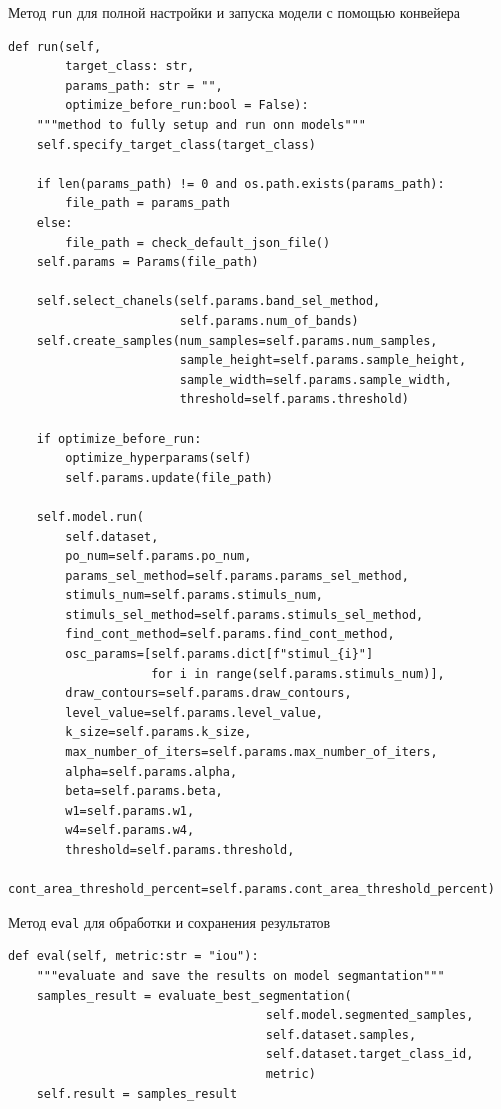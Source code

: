 \documentclass[14pt, russian]{scrartcl}
\begin{document}
\begin{listing}[htt!]
    \caption{Метод \texttt{run} для полной настройки и запуска модели с помощью конвейера}
    \label{lst:pipeline_run}
    \begin{verbatim}
def run(self, 
        target_class: str,
        params_path: str = "",
        optimize_before_run:bool = False):
    """method to fully setup and run onn models"""
    self.specify_target_class(target_class)

    if len(params_path) != 0 and os.path.exists(params_path):
        file_path = params_path
    else:
        file_path = check_default_json_file()
    self.params = Params(file_path)

    self.select_chanels(self.params.band_sel_method, 
                        self.params.num_of_bands)
    self.create_samples(num_samples=self.params.num_samples,
                        sample_height=self.params.sample_height,
                        sample_width=self.params.sample_width,
                        threshold=self.params.threshold)
    
    if optimize_before_run:     
        optimize_hyperparams(self)
        self.params.update(file_path)

    self.model.run(
        self.dataset, 
        po_num=self.params.po_num, 
        params_sel_method=self.params.params_sel_method,
        stimuls_num=self.params.stimuls_num,
        stimuls_sel_method=self.params.stimuls_sel_method,
        find_cont_method=self.params.find_cont_method, 
        osc_params=[self.params.dict[f"stimul_{i}"] 
                    for i in range(self.params.stimuls_num)],
        draw_contours=self.params.draw_contours,
        level_value=self.params.level_value,
        k_size=self.params.k_size,
        max_number_of_iters=self.params.max_number_of_iters,
        alpha=self.params.alpha,
        beta=self.params.beta,
        w1=self.params.w1,
        w4=self.params.w4,
        threshold=self.params.threshold,
        cont_area_threshold_percent=self.params.cont_area_threshold_percent)
    \end{verbatim}
\end{listing}

\begin{listing}[htt!]
    \caption{Метод \texttt{eval} для обработки и сохранения результатов}
    \label{lst:pipeline_eval}
    \begin{verbatim}
def eval(self, metric:str = "iou"):
    """evaluate and save the results on model segmantation"""
    samples_result = evaluate_best_segmentation(
                                    self.model.segmented_samples,
                                    self.dataset.samples,
                                    self.dataset.target_class_id,
                                    metric)
    self.result = samples_result
    \end{verbatim}
\end{listing}
\end{document}
